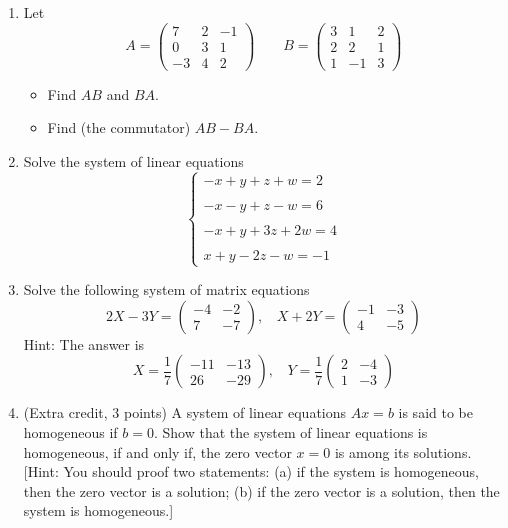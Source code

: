 \documentclass[fleqn]{article}
\begin{document}
  \begin{enumerate}
    \item Let 
    $$A=\begin{pmatrix}
      7 & 2 & -1 \\
      0 & 3 & 1 \\
      -3 & 4 & 2
    \end{pmatrix} ~~~~~~~~~ B=\begin{pmatrix}
      3 & 1 & 2 \\
      2 & 2 & 1 \\
      1 & -1 & 3
    \end{pmatrix}$$

      \begin{itemize}
        \item Find $AB$ and $BA$.
        \item Find (the commutator) $AB-BA$.
      \end{itemize}
    
    \item Solve the system of linear equations
      $$
        \begin{cases}
          -x+y+z+w=2 \\
          \\
          -x-y+z-w=6 \\
          \\
          -x+y+3z+2w=4 \\
          \\
          x+y-2z-w=-1
        \end{cases}
      $$

    \item Solve the following system of matrix equations
      $$
        2X-3Y=\begin{pmatrix}
          -4 & -2 \\
          7 & -7
        \end{pmatrix}, ~~~~ X+2Y=\begin{pmatrix}
          -1 & -3 \\
          4 & -5
        \end{pmatrix}
      $$
      Hint: The answer is 
      $$
        X=\dfrac{1}{7}\begin{pmatrix}
          -11 & -13 \\
          26 & -29
        \end{pmatrix}, ~~~~ Y=\dfrac{1}{7}\begin{pmatrix}
          2 & -4 \\
          1 & -3
        \end{pmatrix}
      $$


    \item (Extra credit, 3 points) A system of linear equations $Ax=b$ is said to be homogeneous if
    $b=0$. Show that the system of linear equations is homogeneous, if and only if, the zero
    vector $x=0$ is among its solutions.
    [Hint: You should proof two statements: (a) if the system is homogeneous, 
    then the zero vector is a solution; (b) if the zero vector is a solution,
    then the system is homogeneous.]
  
  \end{enumerate}
\end{document}
